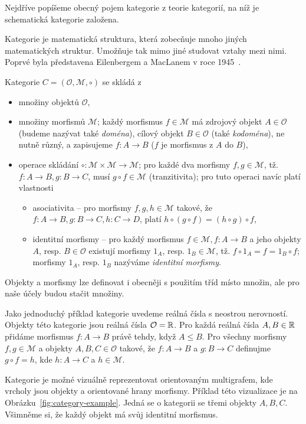 Nejdříve popíšeme obecný pojem kategorie z teorie kategorií, na níž je schematická kategorie založena.

Kategorie je matematická struktura, která zobecňuje mnoho jiných matematických struktur.
Umožňuje tak mimo jiné studovat vztahy mezi nimi.
Poprvé byla představena Eilenbergem a MacLanem v roce 1945~\cite{eilenberg_generaltheory_1945}.

Kategorie $C=(\mathcal O, \mathcal M, \circ)$ se skládá
z \begin{itemize}
  \item množiny objektů $\mathcal O$,
  \item množiny morfismů $\mathcal M$; každý morfismus $f \in \mathcal M$ má zdrojový objekt $A\in\mathcal O$ (budeme nazývat také \emph{doména}), cílový objekt $B\in\mathcal O$ (také \emph{kodoména}), ne nutně různý, a zapisujeme $f: A\to B$ ($f$ je morfismus z $A$ do $B$),
  \item operace skládání $\circ\colon \mathcal M\times\mathcal M \to \mathcal M$; pro každé dva morfismy $f,g\in\mathcal M$, tž. $f\colon A\to B, g\colon B\to C$, musí $g\circ f\in \mathcal M$ (tranzitivita); pro tuto operaci navíc platí vlastnosti
        \begin{itemize}
          \item asociativita -- pro morfismy $f,g,h\in\mathcal M$ takové, že $f\colon A\to B, g\colon B\to C, h\colon C\to D$, platí $h\circ (g \circ f) = (h\circ g)\circ f$,
          \item identitní morfismy -- pro každý morfismus $f\in\mathcal M, f\colon A\to B$ a jeho objekty $A$, resp. $B\in\mathcal O$ existují morfismy $1_A$, resp. $1_B\in\mathcal M$, tž. $f\circ 1_A = f = 1_B\circ f$; morfismy $1_A$, resp. $1_B$ nazýváme \emph{identitní morfismy}.
        \end{itemize}
\end{itemize}

Objekty a morfismy lze definovat i obecněji s použitím tříd místo množin, ale pro naše účely budou stačit množiny.

Jako jednoduchý příklad kategorie uvedeme reálná čísla s neostrou nerovností.
Objekty této kategorie jsou reálná čísla $\mathcal O=\mathbb{R}$.
Pro každá reálná čísla $A,B\in\mathbb{R}$ přidáme morfismus $f\colon A\to B$ právě tehdy, když $A\leq B$.
Pro všechny morfismy $f,g\in\mathcal M$ a objekty $A, B, C\in\mathcal O$ takové, že $f\colon A\to B$ a $g\colon B\to C$ definujme $g\circ f=h$, kde $h\colon A\to C$ a $h\in\mathcal M$.

Kategorie je možné vizuálně reprezentovat orientovaným multigrafem, kde vrcholy jsou objekty a orientované hrany morfismy.
Příklad této vizualizace je na Obrázku~\ref{fig:category-example}.
Jedná se o kategorii se třemi objekty $A, B, C$.
Všimněme si, že každý objekt má svůj identitní morfismus.

